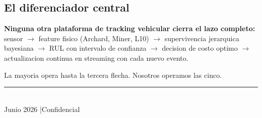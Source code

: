 \documentclass[10.5pt,a4paper]{article}
\begin{document}
\subsection{El diferenciador central}

\begin{greenbox}
\textbf{Ninguna otra plataforma de tracking vehicular cierra el lazo
completo:} sensor $\to$ feature fisico (Archard, Miner, L10) $\to$ supervivencia
jerarquica bayesiana $\to$ RUL con intervalo de confianza $\to$ decision de costo
optimo $\to$ actualizacion continua en streaming con cada nuevo evento.

La mayoria opera hasta la tercera flecha. Nosotros operamos las cinco.
\end{greenbox}

\vspace{0.8cm}
\begin{center}
{\color{bordercol}\rule{0.35\textwidth}{0.5pt}}\\[0.35cm]
{\small\color{muted}Junio 2026 \quad|\quad Confidencial}
\end{center}
\end{document}
